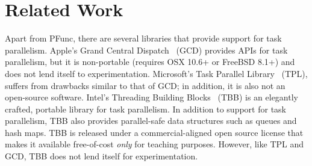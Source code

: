 \documentclass[9pt,twocolumn,letter]{article}
\begin{document}
\section{Related Work}
Apart from PFunc, there are several libraries that provide support for task 
parallelism.
%
Apple's Grand Central Dispatch~\cite{kn:gcd} (GCD) provides APIs for task
parallelism, but it is non-portable (requires OSX 10.6+ or FreeBSD 8.1+) and
does not lend itself to experimentation.
%
Microsoft's Task Parallel Library~\cite{kn:tpl} (TPL), suffers from drawbacks
similar to that of GCD; in addition, it is also not an open-source software.
%
Intel's Threading Building Blocks~\cite{kn:tbb} (TBB) is an elegantly crafted,
portable library for task parallelism.
%
In addition to support for task parallelism, TBB also provides parallel-safe 
data structures such as queues and hash maps.
%
TBB is released under a commercial-aligned open source license that makes it
available free-of-cost \textit{only} for teaching purposes.
%
However, like TPL and GCD, TBB does not lend itself for experimentation.

\footnotesize


\end{document}
